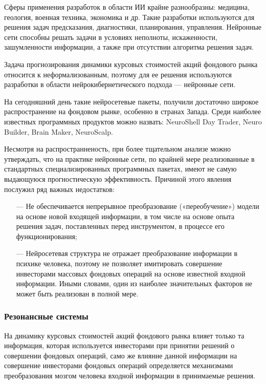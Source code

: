 \par Сферы применения разработок в области ИИ крайне разнообразны: медицина,
геология, военная техника, экономика и др. Такие разработки используются для решения
задач предсказания, диагностики, планирования, управления. Нейронные сети способны
решать задачи в условиях неполноты, искаженности, зашумленности информации, а также
при отсутствии алгоритма решения задач.
\par Задача прогнозирования динамики курсовых стоимостей акций фондового рынка
относится к неформализованным, поэтому для ее решения используются разработки в
области нейрокибернетического подхода –-- нейронные сети.
\par На сегодняшний день такие нейросетевые пакеты, получили достаточно широкое
распространение на фондовом рынке, особенно в странах Запада. Среди наиболее
известных программных продуктов можно назвать: NeuroShell Day Trader, Neuro Builder,
Brain Maker, NeuroScalp.
\par Несмотря на распространненость, при более тщательном анализе можно утверждать, что на практике нейронные сети, по крайней мере реализованные в стандартных
специализированных программных пакетах, имеют не самую выдающуюся прогностическую
эффективность.\cite{time-series-analysis} Причиной этого явления послужил ряд важных недостатков:
\begin{itemize}[leftmargin=1.6\parindent]
	\item[---] Не обеспечивается непрерывное преобразование («переобучение») модели на
основе новой входящей информации, в том числе на основе опыта решения задач,
поставленных перед инструментом, в процессе его функционирования;
    \item[---] Нейросетевая структура не отражает преобразование информации в
психике человека, поэтому не позволяет имитировать совершение инвесторами массовых
фондовых операций на основе известной входной информации. Иными словами, один из наиболее значительных факторов не может быть реализован в полной мере.

\end{itemize}

\subsubsection{Резонансные системы}



\par На динамику курсовых
стоимостей акций фондового рынка влияет только та информация, которая используется
инвесторами при принятии решений о совершении фондовых операций, само же влияние
данной информации на совершение инвесторами фондовых операций определяется
механизмами преобразования мозгом человека входной информации в принимаемые
решения.

